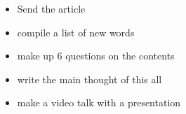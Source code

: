 \documentclass[a4paper, 12pt]{article}
\begin{document}
\begin{itemize}
	\item Send the article
	\item compile a list of new words
	\item make up 6 questions on the contents
	\item write the main thought of this all
	\item make a video talk with a presentation
\end{itemize}
\end{document}

